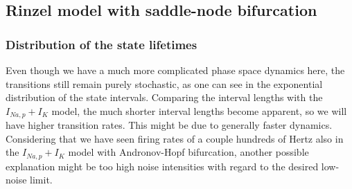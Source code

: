 \documentclass[12pt,a4paper]{article}
\begin{document}
\subsection{Rinzel model with saddle-node bifurcation}
\subsubsection{Distribution of the state lifetimes}
Even though we have a much more complicated phase space dynamics here, the transitions still remain purely stochastic, as one can see in the exponential distribution of the state intervals. Comparing the interval lengths with the $I_{Na,p}+I_K$ model, the much shorter interval lengths become apparent, so we will have higher transition rates. This might be due to generally faster dynamics. Considering that we have seen firing rates of a couple hundreds of Hertz also in the $I_{Na,p}+I_K$ model with Andronov-Hopf bifurcation, another possible explanation might be too high noise intensities with regard to the desired low-noise limit.
\end{document}
